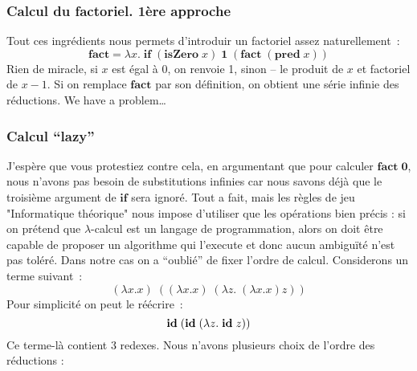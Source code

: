 \subsubsection*{Calcul du factoriel. 1ère approche}
Tout ces ingrédients nous permets d'introduir un factoriel assez naturellement~:
$$\mathbf{fact} = \lambda x. \; \mathbf{if} \; (\mathbf{isZero} \; x) \; \mathbf{1} \; (\mathbf{fact} \; (\mathbf{pred} \; x))$$
Rien de miracle, si $x$ est égal à 0, on renvoie 1, sinon -- le produit de $x$ et factoriel de $x-1$.
Si on remplace $\mathbf{fact}$ par son définition, on obtient une série infinie des réductions. We have a problem\ldots

\subsubsection*{Calcul ``lazy''}
J'espère que vous protestiez contre cela, en argumentant que pour calculer $\mathbf{fact\;0}$, nous n'avons pas besoin de substitutions infinies car nous savons déjà que le troisième argument de $\mathbf{if}$ sera ignoré.
Tout a fait, mais les règles de jeu "Informatique théorique" nous impose d'utiliser que les opérations bien précis : si on prétend que $\lambda$-calcul est un langage de programmation, alors on doit être capable de proposer un algorithme qui l'execute et donc aucun ambiguïté n'est pas toléré.
Dans notre cas on a ``oublié'' de fixer l'ordre de calcul.
Considerons un terme suivant~:
$$(\lambda x.x) \; ((\lambda x.x) \; (\lambda z. \; (\lambda x.x) z))$$
Pour simplicité on peut le réécrire~:
$$\mathbf{id} \; (\mathbf{id} \; (\lambda z. \; \mathbf{id} \; z))$$
Ce terme-là contient 3 redexes. Nous n'avons plusieurs choix de l'ordre des réductions :
